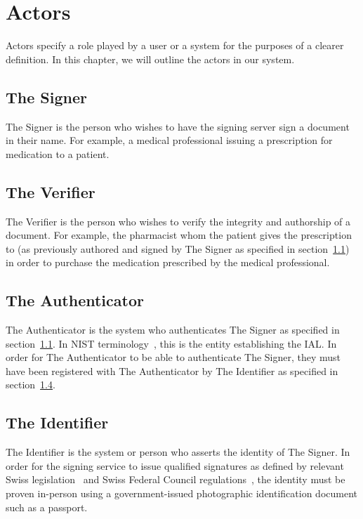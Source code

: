 \chapter{Actors}
\label{ch:actors}

Actors specify a role played by a user or a system for the purposes of a clearer definition.
In this chapter, we will outline the actors in our system.


\section{The Signer}
\label{sec:actorsigner}
The Signer is the person who wishes to have the signing server sign a document in their name.
For example, a medical professional issuing a prescription for medication to a patient.

\section{The Verifier}
\label{sec:actorverifier}
The Verifier is the person who wishes to verify the integrity and authorship of a document.
For example, the pharmacist whom the patient gives the prescription to (as previously authored and signed by The Signer as specified in section~\ref{sec:actorsigner}) in order to purchase the medication prescribed by the medical professional.

\section{The Authenticator}
\label{sec:actorauthenticator}
The Authenticator is the system who authenticates The Signer as specified in section~\ref{sec:actorsigner}.
In \gls{NIST} terminology~\cite{nistdigitalidentityguidelines}, this is the entity establishing the \gls{IAL}.
In order for The Authenticator to be able to authenticate The Signer,
they must have been registered with The Authenticator by The Identifier as specified in section~\ref{sec:authoridentifier}.

\section{The Identifier}
\label{sec:authoridentifier}
The Identifier is the system or person who asserts the identity of The Signer.
In order for the signing service to issue qualified signatures as defined by relevant Swiss legislation~\cite{zertes} and Swiss Federal Council regulations~\cite{vzertes},
the identity must be proven in-person using a government-issued photographic identification document such as a passport.